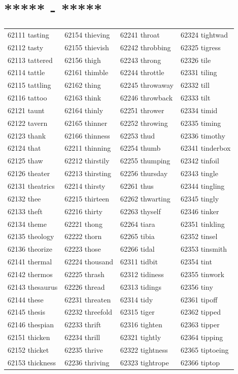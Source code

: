 \documentclass[10pt, oneside]{book}
\begin{document}
\begin{table}[h]
	\centering
	\section*{***** - *****}
	\begin{tabular}{l l l l}
62111 tasting &62154 thieving &62241 throat &62324 tightwad\\
62112 tasty &62155 thievish &62242 throbbing &62325 tigress\\
62113 tattered &62156 thigh &62243 throng &62326 tile\\
62114 tattle &62161 thimble &62244 throttle &62331 tiling\\
62115 tattling &62162 thing &62245 throwaway &62332 till\\
62116 tattoo &62163 think &62246 throwback &62333 tilt\\
62121 taunt &62164 thinly &62251 thrower &62334 timid\\
62122 tavern &62165 thinner &62252 throwing &62335 timing\\
62123 thank &62166 thinness &62253 thud &62336 timothy\\
62124 that &62211 thinning &62254 thumb &62341 tinderbox\\
62125 thaw &62212 thirstily &62255 thumping &62342 tinfoil\\
62126 theater &62213 thirsting &62256 thursday &62343 tingle\\
62131 theatrics &62214 thirsty &62261 thus &62344 tingling\\
62132 thee &62215 thirteen &62262 thwarting &62345 tingly\\
62133 theft &62216 thirty &62263 thyself &62346 tinker\\
62134 theme &62221 thong &62264 tiara &62351 tinkling\\
62135 theology &62222 thorn &62265 tibia &62352 tinsel\\
62136 theorize &62223 those &62266 tidal &62353 tinsmith\\
62141 thermal &62224 thousand &62311 tidbit &62354 tint\\
62142 thermos &62225 thrash &62312 tidiness &62355 tinwork\\
62143 thesaurus &62226 thread &62313 tidings &62356 tiny\\
62144 these &62231 threaten &62314 tidy &62361 tipoff\\
62145 thesis &62232 threefold &62315 tiger &62362 tipped\\
62146 thespian &62233 thrift &62316 tighten &62363 tipper\\
62151 thicken &62234 thrill &62321 tightly &62364 tipping\\
62152 thicket &62235 thrive &62322 tightness &62365 tiptoeing\\
62153 thickness &62236 thriving &62323 tightrope &62366 tiptop\\
	\end{tabular}
 \end{table}
\end{document}
